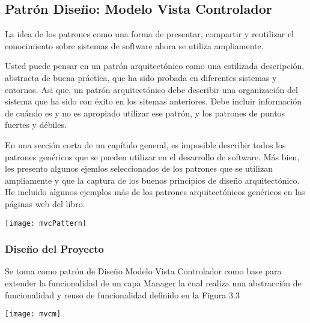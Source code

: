 \subsection{Patr\'{o}n Dise\"{n}o: Modelo Vista Controlador}

La idea de los patrones como una forma de presentar, compartir y reutilizar el conocimiento sobre sistemas de software ahora se
utiliza ampliamente.

Usted puede pensar en un patr\'{o}n arquitect\'{o}nico como una estilizada descripci\'{o}n, abstracta de buena pr\'{a}ctica, que
ha sido probada en diferentes sistemas y entornos. Asi que, un patr\'{o}n arquitect\'{o}nico debe describir una organizaci\'{o}n
del sistema que ha sido con \'{e}xito en los sitemas anteriores. Debe incluir informaci\'{o}n de cu\'{a}ndo es y no es apropiado
utilizar ese patr\'{o}n, y los patrones de puntos fuertes y d\'{e}biles.

En una secci\'{o}n corta de un cap\'{i}tulo general, es imposible describir todos los patrones gen\'{e}ricos que se pueden utilizar
en el desarrollo de software. M\'{a}s bien, les presento algunos ejemlos seleccionados de los patrones que se utilizan ampliamente
y que la captura de los buenos principios de dise\"{n}o arquitect\'{o}nico. He incluido algunos ejemplos m\'{a}s de los patrones 
arquitect\'{o}nicos gen\'{e}ricos en las p\'{a}ginas web del libro.\cite{sommerville2011software}

\begin{minipage}{1.0\textwidth}
	\centering
	\texttt{[image: mvcPattern]}
\end{minipage}

\subsubsection{ Dise\"{n}o del Proyecto}

Se toma como patr\'{o}n de Dise\"{n}o Modelo Vista Controlador como base para extender la funcionalidad de un capa Manager la cual
realiza una abstracci\'{o}n de funcionalidad y reuso de funcionalidad definido en la Figura 3.3

\begin{minipage}{1.0\textwidth}
	\centering
	\texttt{[image: mvcm]}
\end{minipage}


